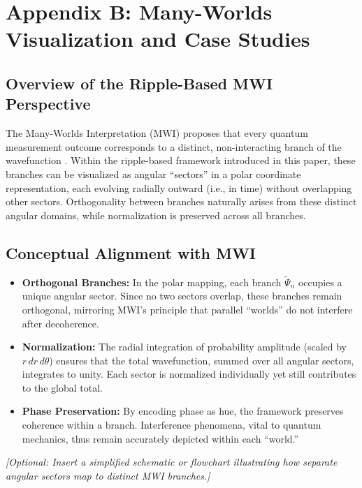 \documentclass{article}
\begin{document}
\newpage

\section{Appendix B: Many-Worlds Visualization and Case Studies}
\label{appendix:B}

\subsection{Overview of the Ripple-Based MWI Perspective}
The Many-Worlds Interpretation (MWI) proposes that every quantum measurement outcome corresponds to a distinct, non-interacting branch of the wavefunction \citep{everett1957}. Within the ripple-based framework introduced in this paper, these branches can be visualized as angular “sectors” in a polar coordinate representation, each evolving radially outward (i.e., in time) without overlapping other sectors. Orthogonality between branches naturally arises from these distinct angular domains, while normalization is preserved across all branches.

\subsection{Conceptual Alignment with MWI}
\begin{itemize}
    \item \textbf{Orthogonal Branches:}
    In the polar mapping, each branch \(\tilde{\Psi}_n\) occupies a unique angular sector. Since no two sectors overlap, these branches remain orthogonal, mirroring MWI’s principle that parallel “worlds” do not interfere after decoherence.
    \item \textbf{Normalization:}
    The radial integration of probability amplitude (scaled by \(r\,dr\,d\theta\)) ensures that the total wavefunction, summed over all angular sectors, integrates to unity. Each sector is normalized individually yet still contributes to the global total.
    \item \textbf{Phase Preservation:}
    By encoding phase as hue, the framework preserves coherence within a branch. Interference phenomena, vital to quantum mechanics, thus remain accurately depicted within each “world.”
\end{itemize}

\noindent
\textit{[Optional: Insert a simplified schematic or flowchart illustrating how separate angular sectors map to distinct MWI branches.]}

\end{document}
